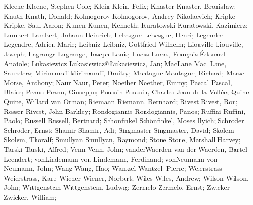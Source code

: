 \DefFriend Kleene           Kleene, Stephen Cole;
\DefFriend Klein            Klein, Felix;
\DefFriend Knaster          Knaster, Bronisław;
\DefFriend Knuth            Knuth, Donald;
\DefFriend Kolmogorov       Kolmogorov, Andrey Nikolaevich;
\DefFriend Kripke           Kripke, Saul Aaron;
\DefFriend Kunen            Kunen, Kenneth;
\DefFriend Kuratowski       Kuratowski, Kazimierz;
\DefFriend Lambert          Lambert, Johann Heinrich;
\DefFriend Lebesgue         Lebesgue, Henri;
\DefFriend Legendre         Legendre, Adrien-Marie;
\DefFriend Leibniz          Leibniz, Gottfried Wilhelm;
\DefFriend Liouville        Liouville, Joseph;
\DefFriend Lagrange         Lagrange, Joseph-Louis;
\DefFriend Lucas            Lucas, François Édouard Anatole;
\DefFriend Lukasiewicz      Lukasiewicz@Łukasiewicz, Jan;
\DefFriend MacLane          Mac~Lane, Saunders;
\DefFriend Mirimanoff       Mirimanoff, Dmitry;
\DefFriend Montague         Montague, Richard;
\DefFriend Morse            Morse, Anthony;
\DefFriend Naur             Naur, Peter;
\DefFriend Noether          Noether, Emmy;
\DefFriend Pascal           Pascal, Blaise;
\DefFriend Peano            Peano, Giuseppe;
\DefFriend Poussin          Poussin, Charles Jean de la Vallée;
\DefFriend Quine            Quine, Willard van Orman;
\DefFriend Riemann          Riemann, Bernhard;
\DefFriend Rivest           Rivest, Ron;
\DefFriend Rosser           Rivest, John Barkley;
\DefFriend Rondogiannis     Rondogiannis, Panos;
\DefFriend Ruffini          Ruffini, Paolo;
\DefFriend Russell          Russell, Bertnard;
\DefFriend Schonfinkel      Schönfinkel, Moses Ilyich;
\DefFriend Schroder         Schröder, Ernst;
\DefFriend Shamir           Shamir, Adi;
\DefFriend Singmaster       Singmaster, David;
\DefFriend Skolem           Skolem, Thoralf;
\DefFriend Smullyan         Smullyan, Raymond;
\DefFriend Stone            Stone, Marshall Harvey;
\DefFriend Tarski           Tarski, Alfred;
\DefFriend Venn             Venn, John;
\DefFriend vanderWaerden    van der Waerden, Bartel Leendert;
\DefFriend vonLindemann     von Lindemann, Ferdinand;
\DefFriend vonNeumann       von Neumann, John;
\DefFriend Wang             Wang, Hao;
\DefFriend Wantzel          Wantzel, Pierre;
\DefFriend Weierstrass      Weierstrass, Karl;
\DefFriend Wiener           Wiener, Norbert;
\DefFriend Wiles            Wiles, Andrew;
\DefFriend Wilson           Wilson, John;
\DefFriend Wittgenstein     Wittgenstein, Ludwig;
\DefFriend Zermelo          Zermelo, Ernst;
\DefFriend Zwicker          Zwicker, William;
